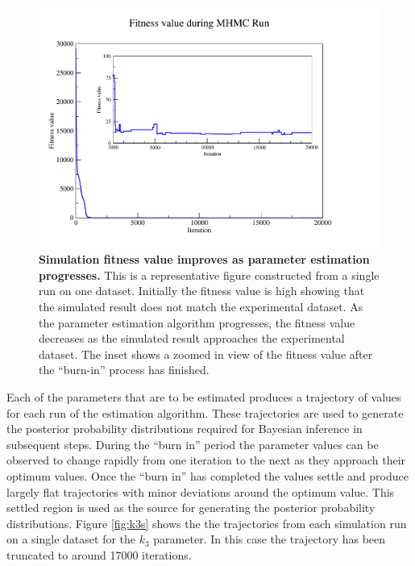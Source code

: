 \begin{figure}[tbp]
 \centering
 \includegraphics[width=14cm, trim=75px 50px 125px 25px]{./05-oxygenreduction/data/o2_fitness.pdf}
 \caption[Simulation fitness value improves as parameter estimation progresses]{{\bf Simulation fitness value improves as parameter estimation progresses.} This is a representative figure constructed from a single run on one dataset. Initially the fitness value is high showing that the simulated result does not match the experimental dataset. As the parameter estimation algorithm progresses, the fitness value decreases as the simulated result approaches the experimental dataset. The inset shows a zoomed in view of the fitness value after the ``burn-in'' process has finished.
 \label{fig:oxy_fitness}}
\end{figure}

Each of the parameters that are to be estimated produces a trajectory of values for each run of the estimation algorithm. These trajectories are used to generate the posterior probability distributions required for Bayesian inference in subsequent steps. During the ``burn in'' period the parameter values can be observed to change rapidly from one iteration to the next as they approach their optimum values. Once the ``burn in'' has completed the values settle and produce largely flat trajectories with minor deviations around the optimum value. This settled region is used as the source for generating the posterior probability distributions. Figure \ref{fig:k3s} shows the the trajectories from each simulation run on a single dataset for the $k_3$ parameter. In this case the trajectory has been truncated to around 17000 iterations.


